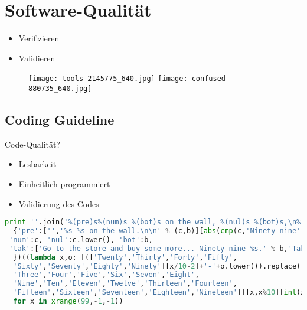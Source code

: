 \documentclass[ignorenonframetext, 11pt, table]{beamer}
\begin{document}
\section{Software-Qualität}
\begin{frame}
\begin{itemize}
    \item<1-> Verifizieren
    \item<2-> Validieren
\end{itemize}

\begin{figure}
    \texttt{[image: tools-2145775\_640.jpg]}\pause
    \texttt{[image: confused-880735\_640.jpg]}
\end{figure}

\end{frame}

\subsection{Coding Guideline}
\begin{frame}
\begin{center}
\Huge Code-Qualität?
\end{center}
\end{frame}

\begin{frame}
\begin{itemize}
\setlength\itemsep{0.2em}
    \item<1->Lesbarkeit
    \item<2->Einheitlich programmiert
    \item<3->Validierung des Codes 
\end{itemize}
\end{frame}

\begin{frame}[fragile]
\begin{lstlisting}[language=python,basicstyle=\tiny,caption={\url{http://wiki.c2.com/?ObfuscatedPython}}]
  print ''.join('%(pre)s%(num)s %(bot)s on the wall, %(nul)s %(bot)s,\n%(tak)s\n' % (lambda c,b:
  {'pre':['','%s %s on the wall.\n\n' % (c,b)][abs(cmp(c,'Ninety-nine'))],
 'num':c, 'nul':c.lower(), 'bot':b,
 'tak':['Go to the store and buy some more... Ninety-nine %s.' % b,'Take one down, pass it around,'][abs(cmp(x,0))]
  })((lambda x,o: [(['Twenty','Thirty','Forty','Fifty',
  'Sixty','Seventy','Eighty','Ninety'][x/10-2]+'-'+o.lower()).replace('-no more',''), o][int(x<20)])(x, ['No more','One','Two',
  'Three','Four','Five','Six','Seven','Eight',
  'Nine','Ten','Eleven','Twelve','Thirteen','Fourteen',
  'Fifteen','Sixteen','Seventeen','Eighteen','Nineteen'][[x,x%10][int(x>=20)]]),'bottle%s of beer' % ['','s'][abs(cmp(x,1))])
  for x in xrange(99,-1,-1))
\end{lstlisting}
\end{frame}
\end{document}
